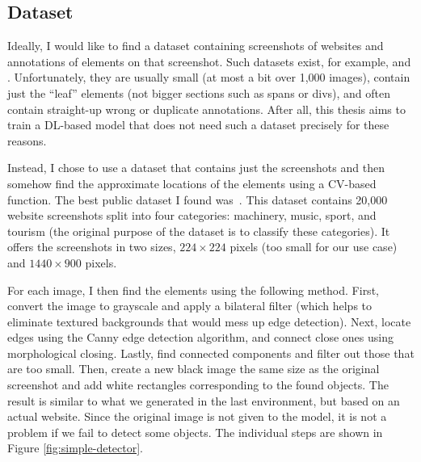 \documentclass[
  digital,     %
  oneside,     %
  nosansbold,  %
  nocolorbold, %
  lof,         %
  lot,         %
]{fithesis4}
\begin{document}
\subsection{Dataset}
\label{subsec:dataset}

Ideally, I would like to find a dataset containing screenshots of websites and annotations of elements on that screenshot. Such datasets exist, for example, \cite{roboflow-dataset-1} and \cite{roboflow-dataset-2}. Unfortunately, they are usually small (at most a bit over 1,000 images), contain just the \enquote{leaf} elements (not bigger sections such as spans or divs), and often contain straight-up wrong or duplicate annotations. After all, this thesis aims to train a DL-based model that does not need such a dataset precisely for these reasons.

Instead, I chose to use a dataset that contains just the screenshots and then somehow find the approximate locations of the elements using a CV-based function. The best public dataset I found was~\cite{aydos2020}. This dataset contains 20,000 website screenshots split into four categories: machinery, music, sport, and tourism (the original purpose of the dataset is to classify these categories). It offers the screenshots in two sizes, $224\times224$ pixels (too small for our use case) and $1440\times900$ pixels.

For each image, I then find the elements using the following method. First, convert the image to grayscale and apply a bilateral filter (which helps to eliminate textured backgrounds that would mess up edge detection). Next, locate edges using the Canny edge detection algorithm, and connect close ones using morphological closing. Lastly, find connected components and filter out those that are too small. Then, create a new black image the same size as the original screenshot and add white rectangles corresponding to the found objects. The result is similar to what we generated in the last environment, but based on an actual website. Since the original image is not given to the model, it is not a problem if we fail to detect some objects. The individual steps are shown in Figure \ref{fig:simple-detector}.
\end{document}
